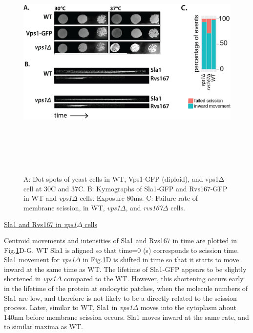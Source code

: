 \vspace{4mm}
	\begin{figure}[H]
	\centering
	\includegraphics[width=12cm,height=12cm,keepaspectratio]{figures/results_final/vps1}
	\caption[Phenotype of \textit{vps1$\Delta$}]
	{A: Dot spots of yeast cells in WT, Vps1-GFP (diploid), and vps1Δ cell at 30C and 37C. 
		B: Kymographs of Sla1-GFP and Rvs167-GFP in WT and \textit{vps1$\Delta$} cells. Exposure 80ms.  
		C: Failure rate of membrane scission, in WT, \textit{vps1$\Delta$}, and \textit{rvs167$\Delta$}  cells. 
		\label{fig4_vpsdel1}}
\end{figure}



\underline{Sla1 and Rvs167 in \textit{vps1$\Delta$} cells}

Centroid movements and intensities of Sla1 and Rvs167 in time are plotted in Fig.\ref{fig4_vpsdel1}D-G. WT Sla1 is aligned so that time=0 (s) corresponds to scission time. Sla1 movement for \textit{vps1$\Delta$}   in Fig.\ref{fig4_vpsdel1}D is shifted in time so that it starts to move inward at the same time as WT. The lifetime of Sla1-GFP appears to be slightly shortened in \textit{vps1$\Delta$}   compared to the WT. However, this shortening occurs early in the lifetime of the protein at endocytic patches, when the molecule numbers of Sla1 are low, and therefore is not likely to be a directly related to the scission process. Later, similar to WT, Sla1 in \textit{vps1$\Delta$}  moves into the cytoplasm about 140nm before membrane scission occurs. Sla1 moves inward at the same rate, and to similar maxima as WT. 


